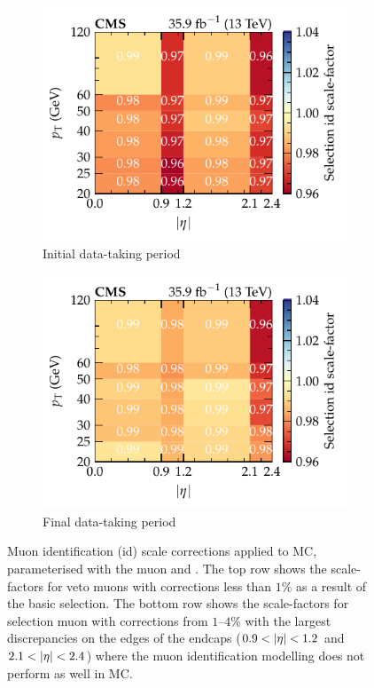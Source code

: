 \begin{figure}[htbp]
    \\
    \begin{subfigure}[b]{0.49\textwidth}
        \centering
        \includegraphics{chapters/041_corrections/images/efficiencies/objects/muons/muon_id_tight_runbf.pdf}
        \caption{Initial data-taking period}
        \label{subfigc:muon-id-scale-factors}
    \end{subfigure}
    \hfill
    \begin{subfigure}[b]{0.49\textwidth}
        \centering
        \includegraphics{chapters/041_corrections/images/efficiencies/objects/muons/muon_id_tight_rungh.pdf}
        \caption{Final data-taking period}
        \label{subfigd:muon-id-scale-factors}
    \end{subfigure}
    \caption{
        Muon identification (id) scale corrections applied to MC, parameterised with the muon \pt and \aeta. The top row shows the scale-factors for veto muons with corrections less than $1\%$ as a result of the basic selection. The bottom row shows the scale-factors for selection muon with corrections from {$1$--$4\%$} with the largest discrepancies on the edges of the endcaps (${0.9<\aeta<1.2}$ and ${2.1<\aeta<2.4}$) where the muon identification modelling does not perform as well in MC. 
    }
    \label{fig:muon-id-scale-factors}
\end{figure}

